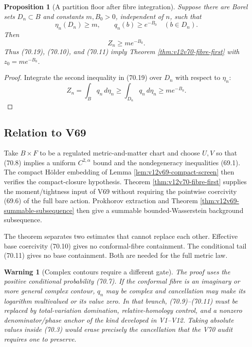 \documentclass[11pt]{article}
\newtheorem{proposition}[theorem]{Proposition}
\newtheorem{warning}[theorem]{Warning}
\theoremstyle{remark}
\begin{document}
\begin{proposition}[A partition floor after fibre integration]
\label{prop:v12v70-floor}
Suppose there are Borel sets \(D_n\subset B\) and constants
\(m,B_0>0\), independent of \(n\), such that
\begin{equation}
 \eta_n(D_n)\geq m,\qquad q_n(b)\geq e^{-B_0}
 \quad(b\in D_n).                                           \tag{70.19}
\end{equation}
Then
\begin{equation}
                              Z_n\geq me^{-B_0}.              \tag{70.20}
\end{equation}
Thus (70.19), (70.10), and (70.11) imply Theorem
\ref{thm:v12v70-fibre-first} with \(z_0=me^{-B_0}\).
\end{proposition}

\begin{proof}
Integrate the second inequality in (70.19) over \(D_n\) with respect
to \(\eta_n\):
\[
 Z_n=\int_Bq_n\,d\eta_n
 \geq\int_{D_n}q_n\,d\eta_n
 \geq me^{-B_0}.
\]
\end{proof}

\subsection{Relation to V69}

Take \(B\times F\) to be a regulated metric-and-matter chart and
choose \(U,V\) so that (70.8) implies a uniform
\(C^{2,\alpha}\) bound and the nondegeneracy inequalities (69.1).
The compact Hölder embedding of Lemma
\ref{lem:v12v69-compact-screen} then verifies the compact-closure
hypothesis.  Theorem \ref{thm:v12v70-fibre-first} supplies the
moment/tightness input of V69 without requiring the pointwise
coercivity (69.6) of the full bare action.  Prokhorov extraction and
Theorem \ref{thm:v12v69-summable-subsequence} then give a summable
bounded-Wasserstein background subsequence.

The theorem separates two estimates that cannot replace each other.
Effective base coercivity (70.10) gives no conformal-fibre
containment.  The conditional tail (70.11) gives no base
containment.  Both are needed for the full metric law.

\begin{warning}[Complex contours require a different gate]
\label{warn:v12v70-complex}
The proof uses the positive conditional probability (70.7).  If the
conformal fibre is an imaginary or more general complex contour,
\(q_n\) may be complex and cancellation may make its logarithm
multivalued or its value zero.  In that branch, (70.9)--(70.11) must
be replaced by total-variation domination, relative-homology control,
and a nonzero denominator/phase anchor of the kind developed in
V1--V12.  Taking absolute values inside (70.3) would erase precisely
the cancellation that the V70 audit requires one to preserve.
\end{warning}
\end{document}
